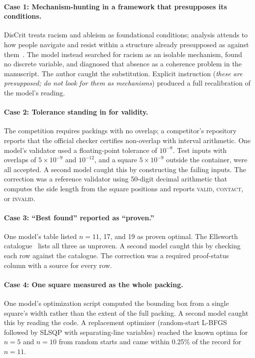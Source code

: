 \documentclass[11pt]{article}
\begin{document}
\paragraph{Case 1: Mechanism-hunting in a framework that presupposes its
conditions.}
DisCrit treats racism and ableism as foundational conditions; analysis
attends to how people navigate and resist within a structure already
presupposed as against them~\cite{annamma2013}. The model instead searched
for racism as an isolable mechanism, found no discrete variable, and
diagnosed that absence as a coherence problem in the manuscript. The author
caught the substitution. Explicit instruction (\emph{these are presupposed;
do not look for them as mechanisms}) produced a full recalibration of the
model's reading.

\paragraph{Case 2: Tolerance standing in for validity.}
The competition requires packings with no overlap; a competitor's
repository reports that the official checker certifies non-overlap with
interval arithmetic. One model's validator used a floating-point tolerance
of $10^{-8}$. Test inputs with overlaps of $5\times10^{-9}$ and $10^{-12}$,
and a square $5\times10^{-9}$ outside the container, were all accepted. A
second model caught this by constructing the failing inputs. The correction
was a reference validator using 50-digit decimal arithmetic that computes
the side length from the square positions and reports \textsc{valid},
\textsc{contact}, or \textsc{invalid}.

\paragraph{Case 3: ``Best found'' reported as ``proven.''}
One model's table listed $n=11$, 17, and 19 as proven optimal. The
Ellsworth catalogue~\cite{ellsworth} lists all three as unproven. A second
model caught this by checking each row against the catalogue. The
correction was a required proof-status column with a source for every row.

\paragraph{Case 4: One square measured as the whole packing.}
One model's optimization script computed the bounding box from a single
square's width rather than the extent of the full packing. A second model
caught this by reading the code. A replacement optimizer (random-start
L-BFGS followed by SLSQP with separating-line variables) reached the known
optima for $n=5$ and $n=10$ from random starts and came within 0.25\% of
the record for $n=11$.
\end{document}
